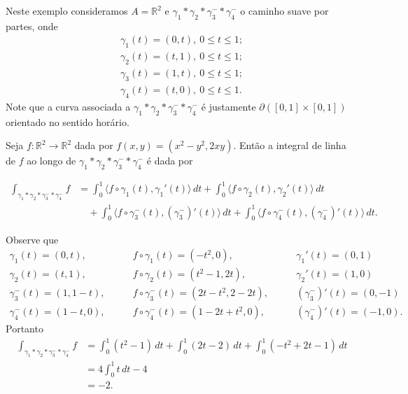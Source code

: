 \begin{exemplo}\label{exemplo-z2-em-R2}
Neste exemplo consideramos $A=\mathbb{R}^2$ e $\gamma_1*\gamma_2*\gamma_3^{-}*\gamma_4^{-}$ 
o caminho suave por partes, onde 
\begin{align*}
\gamma_1(t) = (0,t),\ 0\leqslant t\leqslant 1;
\\[0.2cm]
\gamma_2(t) = (t,1),\ 0\leqslant t\leqslant 1;
\\[0.2cm]
\gamma_3(t) = (1,t),\ 0\leqslant t\leqslant 1;
\\[0.2cm]
\gamma_4(t) = (t,0),\ 0\leqslant t\leqslant 1.
\end{align*}
Note que a curva associada a $\gamma_1*\gamma_2*\gamma_3^{-}*\gamma_4^{-}$  
é justamente $\partial ([0,1]\times[0,1])$ orientado no sentido horário.

Seja $f:\mathbb{R}^2\to\mathbb{R}^2$ dada por $f(x,y)=(x^2-y^2,2xy)$. Então a integral 
de linha de $f$ ao longo de $\gamma_1*\gamma_2*\gamma_3^{-}*\gamma_4^{-}$ é dada por

\begin{align*}
\int_{\gamma_1*\gamma_2*\gamma_3^{-}*\gamma_4^{-}} f
&=
\int_{0}^{1} \langle f\circ\gamma_1(t),\gamma_1'(t) \rangle \, dt
+
\int_{0}^{1} \langle f\circ\gamma_2(t),\gamma_2'(t) \rangle \, dt
\\
&\quad +
\int_{0}^{1} \langle f\circ\gamma^{-}_3(t),(\gamma^{-}_3)'(t) \rangle \, dt
+
\int_{0}^{1} \langle f\circ\gamma^{-}_4(t),(\gamma^{-}_4)'(t) \rangle \, dt.
\end{align*}

Observe que
\[ 
\begin{array}{lll}
\gamma_1(t) = (0,t), 		& \qquad f\circ\gamma_1(t)=(-t^2,0),			& \qquad \gamma_{1}'(t)=(0,1) 
\\[0.2cm]
\gamma_2(t) = (t,1), 		& \qquad f \circ\gamma_2(t)=(t^2-1,2t),			& \qquad\gamma_{2}'(t)=(1,0) 
\\[0.2cm]
\gamma^{-}_3(t) = (1,1-t), 	& \qquad f \circ\gamma^{-}_3(t)=(2t-t^2,2-2t),& \qquad(\gamma_{3}^{-})'(t)=(0,-1) 
\\[0.2cm]
\gamma^{-}_4(t) = (1-t,0), 	& \qquad f\circ\gamma^{-}_4(t)=(1-2t+t^2,0), 	& \qquad(\gamma_{4}^{-})'(t)=(-1,0).
\end{array}
\]
Portanto 
\begin{align*}
\int_{\gamma_1*\gamma_2*\gamma_3^{-}*\gamma_4^{-}} f
&=
\int_{0}^{1} (t^2-1)\, dt
+
\int_{0}^{1} (2t-2)\,  dt
+
\int_{0}^{1} (-t^2+2t-1)\, dt
\\[0.2cm]
&
=
4\int_{0}^{1}t\, dt -4
\\[0.2cm]
&= 
-2.
\end{align*}
\end{exemplo}


